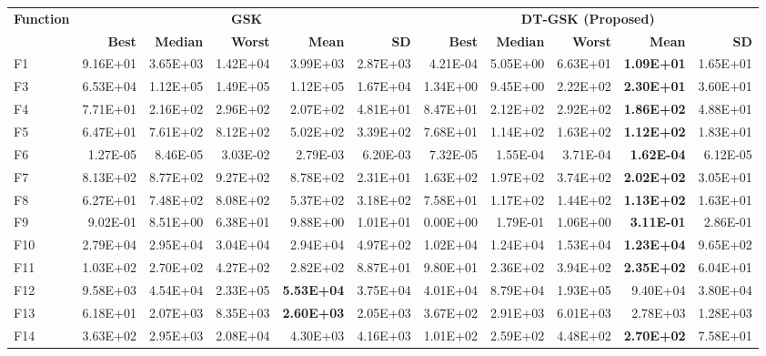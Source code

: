 \zebra
\begin{tabular}{lrrrrrrrrrr}
\toprule
\textbf{Function} & \multicolumn{5}{c}{\textbf{GSK}} & \multicolumn{5}{c}{\textbf{DT-GSK (Proposed)}} \\
\cmidrule(lr){2-6} \cmidrule(lr){7-11}
 & \textbf{Best} & \textbf{Median} & \textbf{Worst} & \textbf{Mean} & \textbf{SD} & \textbf{Best} & \textbf{Median} & \textbf{Worst} & \textbf{Mean} & \textbf{SD} \\
\midrule
F1 & 9.16E+01 & 3.65E+03 & 1.42E+04 & 3.99E+03 & 2.87E+03 & 4.21E-04 & 5.05E+00 & 6.63E+01 & \textbf{1.09E+01} & 1.65E+01 \\
F3 & 6.53E+04 & 1.12E+05 & 1.49E+05 & 1.12E+05 & 1.67E+04 & 1.34E+00 & 9.45E+00 & 2.22E+02 & \textbf{2.30E+01} & 3.60E+01 \\
F4 & 7.71E+01 & 2.16E+02 & 2.96E+02 & 2.07E+02 & 4.81E+01 & 8.47E+01 & 2.12E+02 & 2.92E+02 & \textbf{1.86E+02} & 4.88E+01 \\
F5 & 6.47E+01 & 7.61E+02 & 8.12E+02 & 5.02E+02 & 3.39E+02 & 7.68E+01 & 1.14E+02 & 1.63E+02 & \textbf{1.12E+02} & 1.83E+01 \\
F6 & 1.27E-05 & 8.46E-05 & 3.03E-02 & 2.79E-03 & 6.20E-03 & 7.32E-05 & 1.55E-04 & 3.71E-04 & \textbf{1.62E-04} & 6.12E-05 \\
F7 & 8.13E+02 & 8.77E+02 & 9.27E+02 & 8.78E+02 & 2.31E+01 & 1.63E+02 & 1.97E+02 & 3.74E+02 & \textbf{2.02E+02} & 3.05E+01 \\
F8 & 6.27E+01 & 7.48E+02 & 8.08E+02 & 5.37E+02 & 3.18E+02 & 7.58E+01 & 1.17E+02 & 1.44E+02 & \textbf{1.13E+02} & 1.63E+01 \\
F9 & 9.02E-01 & 8.51E+00 & 6.38E+01 & 9.88E+00 & 1.01E+01 & 0.00E+00 & 1.79E-01 & 1.06E+00 & \textbf{3.11E-01} & 2.86E-01 \\
F10 & 2.79E+04 & 2.95E+04 & 3.04E+04 & 2.94E+04 & 4.97E+02 & 1.02E+04 & 1.24E+04 & 1.53E+04 & \textbf{1.23E+04} & 9.65E+02 \\
F11 & 1.03E+02 & 2.70E+02 & 4.27E+02 & 2.82E+02 & 8.87E+01 & 9.80E+01 & 2.36E+02 & 3.94E+02 & \textbf{2.35E+02} & 6.04E+01 \\
F12 & 9.58E+03 & 4.54E+04 & 2.33E+05 & \textbf{5.53E+04} & 3.75E+04 & 4.01E+04 & 8.79E+04 & 1.93E+05 & 9.40E+04 & 3.80E+04 \\
F13 & 6.18E+01 & 2.07E+03 & 8.35E+03 & \textbf{2.60E+03} & 2.05E+03 & 3.67E+02 & 2.91E+03 & 6.01E+03 & 2.78E+03 & 1.28E+03 \\
F14 & 3.63E+02 & 2.95E+03 & 2.08E+04 & 4.30E+03 & 4.16E+03 & 1.01E+02 & 2.59E+02 & 4.48E+02 & \textbf{2.70E+02} & 7.58E+01 \\

\end{tabular}
